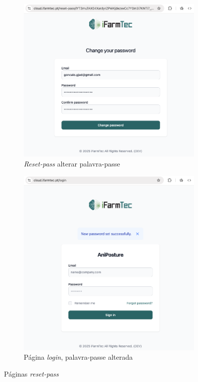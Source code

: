 \begin{figure}[h!]
		\begin{subfigure}[c]{0.30\textwidth}
		\centering
		\includegraphics[width=\textwidth]{figs/reset-pass-3.png}
		\caption{\textit{Reset-pass} alterar palavra-passe}
		\label{fig:resetPassReset}
	\end{subfigure}
	\hfill
	\begin{subfigure}[c]{0.30\textwidth}
		\centering
		\includegraphics[width=\textwidth]{figs/reset-pass-4.png}
		\caption{Página \textit{login}, palavra-passe alterada}
		\label{fig:resetPassResetSuc}
	\end{subfigure}
	\caption{Páginas \textit{reset-pass}}
    \label{fig:pagResetPass}
\end{figure}

